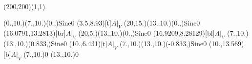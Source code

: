\unitlength=1bp%

\begin{feynartspicture}(200,200)(1,1)

\FADiagram{}
\FAProp(0.,10.)(7.,10.)(0.,){Sine}{0}
\FALabel(3.5,8.93)[t]{$A|_V$}
\FAProp(20,15.)(13.,10.)(0.,){Sine}{0}
\FALabel(16.0791,13.2813)[br]{$A|_V$}
\FAProp(20,5.)(13.,10.)(0.,){Sine}{0}
\FALabel(16.9209,8.28129)[bl]{$A|_V$}
\FAProp(7.,10.)(13.,10.)(0.833,){Sine}{0}
\FALabel(10.,6.431)[t]{$A|_V$}
\FAProp(7.,10.)(13.,10.)(-0.833,){Sine}{0}
\FALabel(10.,13.569)[b]{$A|_V$}
\FAVert(7.,10.){0}
\FAVert(13.,10.){0}
\end{feynartspicture}

